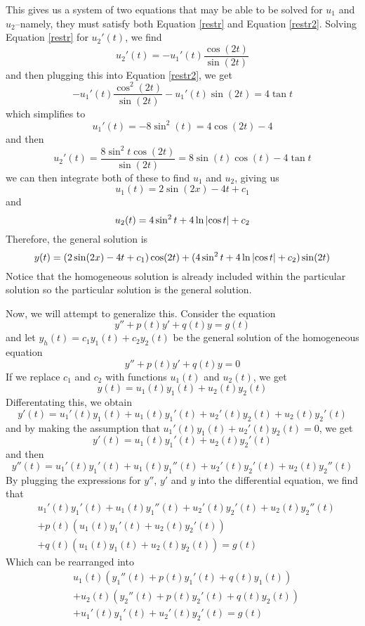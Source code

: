 \begin{example}
\begin{equation}
    \end{equation}
    This gives us a system of two equations that may be able to be solved for $u_1$ and $u_2$--namely, they must satisfy both Equation \ref{restr} and Equation \ref{restr2}. Solving Equation \ref{restr} for $u_2'(t)$, we find
    \[ u_2'(t) = -u_1'(t) \frac{\cos(2t)}{\sin(2t)} \]
    and then plugging this into Equation \ref{restr2}, we get
    \[ -u_1'(t) \frac{\cos^2(2t)}{\sin(2t)} - u_1'(t)\sin(2t) = 4\tan t\]
    which simplifies to
    \[ u_1'(t) = -8\sin^2(t) = 4\cos(2t)-4 \]
    and then 
    \[ u_2'(t) = \frac{8\sin^2 t\cos(2t)}{\sin(2t)} = 8\sin(t)\cos(t) - 4\tan t\]
    we can then integrate both of these to find $u_1$ and $u_2$, giving us
    \[ u_1(t) = 2\sin(2x)-4t+c_1\]
    and
    \[ u_2(t) =4\sin^2t + 4\ln\abs{\cos t} + c_2\]
    Therefore, the general solution is
    \[ y(t) = (2\sin(2x)-4t+c_1)\cos(2t) + (4\sin^2t + 4\ln\abs{\cos t} + c_2)\sin(2t)\]
    Notice that the homogeneous solution is already included within the particular solution so the particular solution is the general solution.
\end{example}
Now, we will attempt to generalize this. Consider the equation
\[ y'' + p(t)y' + q(t)y = g(t) \]
and let $y_h(t) = c_1y_1(t) + c_2y_2(t)$ be the general solution of the homogeneous equation
\[ y'' + p(t)y' + q(t)y = 0 \]
If we replace $c_1$ and $c_2$ with functions $u_1(t)$ and $u_2(t)$, we get
\[ y(t) = u_1(t)y_1(t) + u_2(t)y_2(t) \]
Differentating this, we obtain
\[ y'(t) = u_1'(t)y_1(t) + u_1(t)y_1'(t) + u_2'(t)y_2(t) + u_2(t)y_2'(t) \]
and by making the assumption that $u_1'(t)y_1(t) + u_2'(t)y_2(t) = 0$, we get
\[ y'(t) = u_1(t)y_1'(t) + u_2(t)y_2'(t) \]
and then
\[ y''(t) = u_1'(t)y_1'(t) + u_1(t)y_1''(t) + u_2'(t)y_2'(t) + u_2(t)y_2''(t) \]
By plugging the expressions for $y''$, $y'$ and $y$ into the differential equation, we find that
\begin{align*}
    & u_1'(t)y_1'(t) + u_1(t)y_1''(t) + u_2'(t)y_2'(t) + u_2(t)y_2''(t) \\
    &+ p(t)(u_1(t)y_1'(t) + u_2(t)y_2'(t)) \\
    &+ q(t)(u_1(t)y_1(t) + u_2(t)y_2(t)) = g(t)
\end{align*}
Which can be rearranged into
\begin{align*}
    & u_1(t)(y_1''(t) + p(t)y_1'(t) + q(t)y_1(t)) \\
    &+ u_2(t)(y_2''(t) + p(t)y_2'(t) + q(t)y_2(t)) \\
    &+ u_1'(t)y_1'(t) + u_2'(t)y_2'(t) = g(t)
\end{align*}
